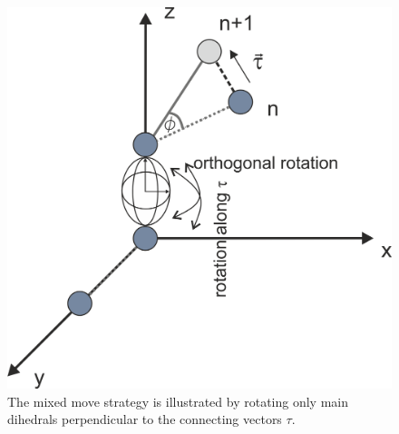 \documentclass[10pt,a4paper]{article} %
\begin{document}
\begin{figure}[h]
	\center
	\includegraphics[scale=0.6]{img/grafik_rot_scheme.png}\caption{The mixed move strategy is illustrated by rotating only main dihedrals perpendicular to the connecting vectors $\tau$.}
	\label{fig:MIX}
\end{figure}
\end{document}
